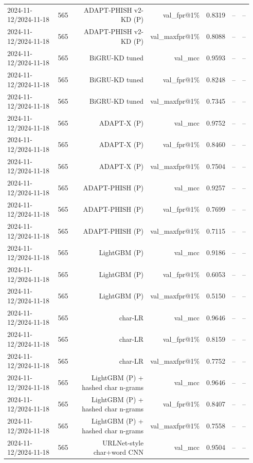 \begin{table}[t]
\begin{tabular}{llrrrrr}
2024-11-12/2024-11-18 & 565 & ADAPT-PHISH v2-KD (P) & val\_fpr@1\% & 0.8319 & -- & -- \\
2024-11-12/2024-11-18 & 565 & ADAPT-PHISH v2-KD (P) & val\_maxfpr@1\% & 0.8088 & -- & -- \\
2024-11-12/2024-11-18 & 565 & BiGRU-KD tuned & val\_mcc & 0.9593 & -- & -- \\
2024-11-12/2024-11-18 & 565 & BiGRU-KD tuned & val\_fpr@1\% & 0.8248 & -- & -- \\
2024-11-12/2024-11-18 & 565 & BiGRU-KD tuned & val\_maxfpr@1\% & 0.7345 & -- & -- \\
2024-11-12/2024-11-18 & 565 & ADAPT-X (P) & val\_mcc & 0.9752 & -- & -- \\
2024-11-12/2024-11-18 & 565 & ADAPT-X (P) & val\_fpr@1\% & 0.8460 & -- & -- \\
2024-11-12/2024-11-18 & 565 & ADAPT-X (P) & val\_maxfpr@1\% & 0.7504 & -- & -- \\
2024-11-12/2024-11-18 & 565 & ADAPT-PHISH (P) & val\_mcc & 0.9257 & -- & -- \\
2024-11-12/2024-11-18 & 565 & ADAPT-PHISH (P) & val\_fpr@1\% & 0.7699 & -- & -- \\
2024-11-12/2024-11-18 & 565 & ADAPT-PHISH (P) & val\_maxfpr@1\% & 0.7115 & -- & -- \\
2024-11-12/2024-11-18 & 565 & LightGBM (P) & val\_mcc & 0.9186 & -- & -- \\
2024-11-12/2024-11-18 & 565 & LightGBM (P) & val\_fpr@1\% & 0.6053 & -- & -- \\
2024-11-12/2024-11-18 & 565 & LightGBM (P) & val\_maxfpr@1\% & 0.5150 & -- & -- \\
2024-11-12/2024-11-18 & 565 & char-LR & val\_mcc & 0.9646 & -- & -- \\
2024-11-12/2024-11-18 & 565 & char-LR & val\_fpr@1\% & 0.8159 & -- & -- \\
2024-11-12/2024-11-18 & 565 & char-LR & val\_maxfpr@1\% & 0.7752 & -- & -- \\
2024-11-12/2024-11-18 & 565 & LightGBM (P) + hashed char n-grams & val\_mcc & 0.9646 & -- & -- \\
2024-11-12/2024-11-18 & 565 & LightGBM (P) + hashed char n-grams & val\_fpr@1\% & 0.8407 & -- & -- \\
2024-11-12/2024-11-18 & 565 & LightGBM (P) + hashed char n-grams & val\_maxfpr@1\% & 0.7558 & -- & -- \\
2024-11-12/2024-11-18 & 565 & URLNet-style char+word CNN & val\_mcc & 0.9504 & -- & -- \\

\end{tabular}
\end{table}
